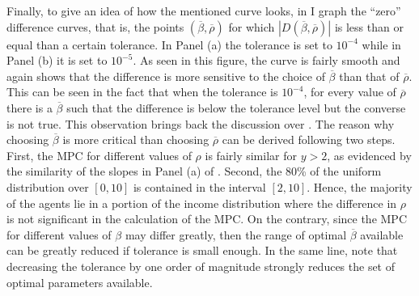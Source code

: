 \documentclass[english, a4paper, 12pt]{article}
\begin{document}
%
	
Finally, to give an idea of how the mentioned curve looks, in  I graph the ``zero'' difference curves, that is, the points $(\overline{\beta}, \overline{\rho})$ for which $|D(\overline{\beta}, \overline{\rho})|$ is less than or equal than a certain tolerance. In Panel (a) the tolerance is set to $10^{-4}$ while in Panel (b) it is set to $10^{-5}$. As seen in this figure, the curve is fairly smooth and again shows that the difference is more sensitive to the choice of $\overline{\beta}$ than that of $\overline{\rho}$. This can be seen in the fact that when the tolerance is $10^{-4}$, for every value of $\overline{\rho}$ there is a $\overline{\beta}$ such that the difference is below the tolerance level but the converse is not true. This observation brings back the discussion over . The reason why choosing $\overline{\beta}$ is more critical than choosing $\overline{\rho}$ can be derived following two steps. First, the MPC for different values of $\rho$ is fairly similar for $y > 2$, as evidenced by the similarity of the slopes in Panel (a) of . Second, the 80\% of the uniform distribution over $[0,10]$ is contained in the interval $[2,10]$. Hence, the majority of the agents lie in a portion of the income distribution where the difference in $\rho$ is not significant in the calculation of the MPC. On the contrary, since the MPC for different values of $\beta$ may differ greatly, then the range of optimal $\overline{\beta}$ available can be greatly reduced if tolerance is small enough. In the same line, note that decreasing the tolerance by one order of magnitude strongly reduces the set of optimal parameters available.
\end{document}
